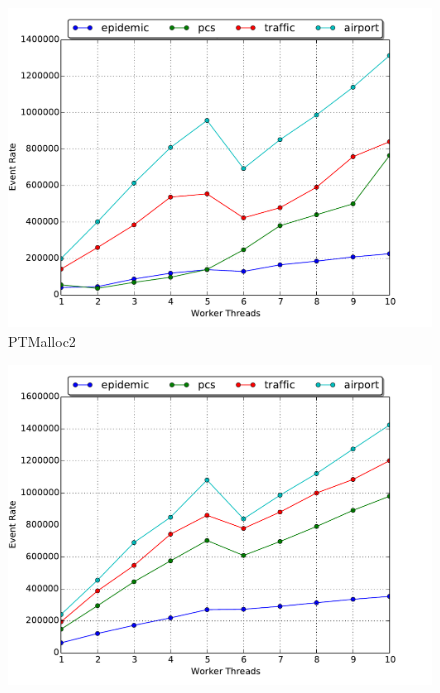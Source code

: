 \documentclass[11pt]{book}
\begin{document}
\begin{figure}
  \begin{minipage}{.5\textwidth}
    \begin{center}
      \includegraphics[width=\textwidth,keepaspectratio,quiet]{figs/memory_allocation/ptmalloc_eventrate.pdf} \\
      PTMalloc2 \\
    \end{center}
  \end{minipage}%
  \hfill
  \begin{minipage}{.5\textwidth}
    \begin{center}
      \includegraphics[width=\textwidth,keepaspectratio,quiet]{figs/memory_allocation/tcmalloc_eventrate.pdf} \\

\end{center}
\end{minipage}
\end{figure}
\end{document}
